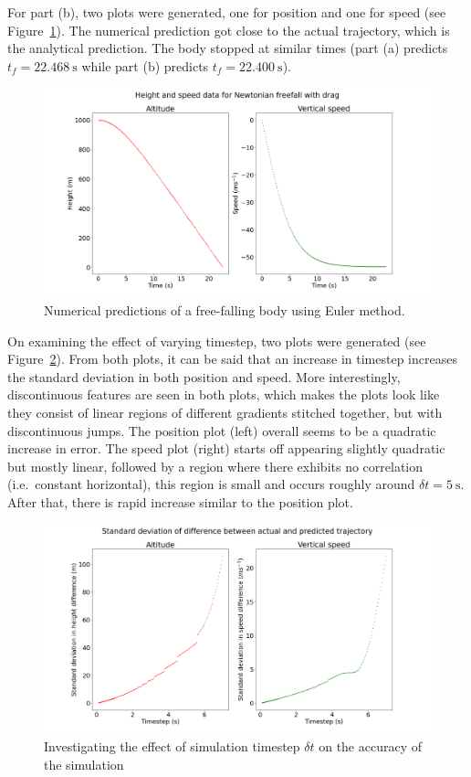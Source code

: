 \documentclass[hyphens,twocolumn,nobalancelastpage,aps,10pt,citeautoscript,longbibliography]{revtex4-2}
\begin{document}
For part (b), two plots were generated, one for position and one for speed
(see Figure~\ref{fig:freefall_numeric}). The numerical prediction got close to
the actual trajectory, which is the analytical prediction. The body stopped at
similar times (part (a) predicts $t_f = \qty{22.468}{\second}$ while part (b)
predicts $t_f = \qty{22.400}{\second}$).
\begin{figure}[htpb]
	\centering
	\includegraphics[width=\linewidth]{freefall_numeric.png}
	\caption{Numerical predictions of a free-falling body using Euler method.}%
	\label{fig:freefall_numeric}
\end{figure}

On examining the effect of varying timestep, two plots were generated (see
Figure~\ref{fig:timestep_std}). From both plots, it can be said that an
increase in timestep increases the standard deviation in both position and
speed. More interestingly, discontinuous features are seen in both plots, which
makes the plots look like they consist of linear regions of different gradients
stitched together, but with discontinuous jumps. The position plot (left)
overall seems to be a quadratic increase in error. The speed plot (right)
starts off appearing slightly quadratic but mostly linear, followed by a region
where there exhibits no correlation (i.e.\ constant horizontal), this region is
small and occurs roughly around $\delta t = \qty{5}{\second}$. After that,
there is rapid increase similar to the position plot.
\begin{figure}[htpb]
	\centering
	\includegraphics[width=\linewidth]{timestep_std.png}
	\caption{Investigating the effect of simulation timestep $\delta t$ on the accuracy of the simulation}%
	\label{fig:timestep_std}
\end{figure}
\end{document}
